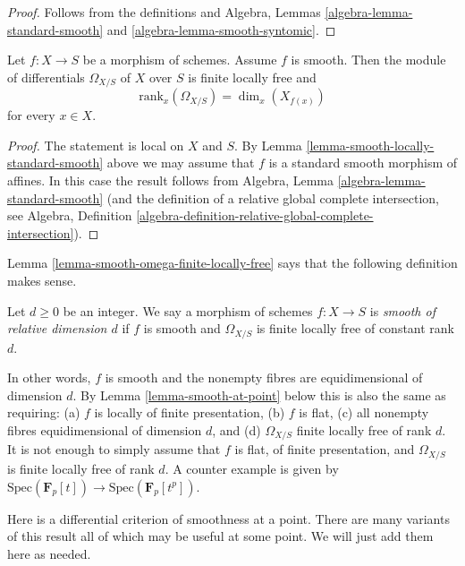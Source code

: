 \begin{proof}
Follows from the definitions and
Algebra, Lemmas \ref{algebra-lemma-standard-smooth}
and \ref{algebra-lemma-smooth-syntomic}.
\end{proof}

\begin{lemma}
\label{lemma-smooth-omega-finite-locally-free}
Let $f : X \to S$ be a morphism of schemes.
Assume $f$ is smooth.
Then the module of differentials $\Omega_{X/S}$ of $X$ over $S$
is finite locally free and
$$
\text{rank}_x(\Omega_{X/S}) = \dim_x(X_{f(x)})
$$
for every $x \in X$.
\end{lemma}

\begin{proof}
The statement is local on $X$ and $S$.
By Lemma \ref{lemma-smooth-locally-standard-smooth}
above we may assume that $f$ is a standard smooth morphism of affines.
In this case the result follows from
Algebra, Lemma \ref{algebra-lemma-standard-smooth}
(and the definition of a relative global complete intersection, see
Algebra,
Definition \ref{algebra-definition-relative-global-complete-intersection}).
\end{proof}

\noindent
Lemma \ref{lemma-smooth-omega-finite-locally-free}
says that the following definition makes sense.

\begin{definition}
\label{definition-smooth-relative-dimension}
Let $d \geq 0$ be an integer. We say a morphism of schemes $f : X \to S$
is {\it smooth of relative dimension $d$} if $f$ is smooth and
$\Omega_{X/S}$ is finite locally free of constant rank $d$.
\end{definition}

\noindent
In other words, $f$ is smooth and the nonempty fibres are equidimensional
of dimension $d$. By Lemma \ref{lemma-smooth-at-point} below this is also
the same as requiring: (a) $f$ is locally of finite presentation, (b) $f$ is
flat, (c) all nonempty fibres equidimensional of dimension $d$, and (d)
$\Omega_{X/S}$ finite locally free of rank $d$. It is not enough to simply
assume that $f$ is flat, of finite presentation, and $\Omega_{X/S}$ is
finite locally free of rank $d$. A counter example is given by
$\text{Spec}(\mathbf{F}_p[t]) \to \text{Spec}(\mathbf{F}_p[t^p])$.

\medskip\noindent
Here is a differential criterion of smoothness at a point.
There are many variants of this result
all of which may be useful at some point. We will just add them
here as needed.

